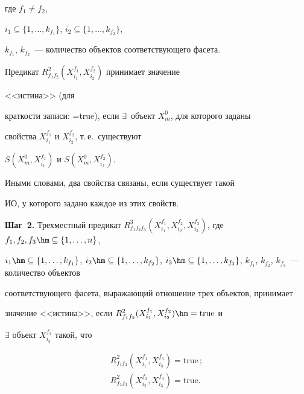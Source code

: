 где $f_1 \not=f_2$,


$i_1\subseteq \{1, \ldots , k_{f_1}\}$, $i_2\subseteq \{1, \ldots , k_{f_2}\}$,


$k_{f_1}$, $k_{f_2}$~--- количество объектов соответствующего фасета.





  Предикат $R^2_{f_1 f_2}(X_{i_1}^{f_1},X_{i_2}^{f_2})$ принимает значение


  <<истина>> (для


краткости записи: =\;true), если $\exists$\ объект $X_m^0$, для которого заданы


свойства $X_{i_1}^{f_1}$ и $X_{i_2}^{f_2}$, т.\,е.\ существуют


${S}(X_m^0,X_{i_1}^{f_1})$ и ${S}(X_m^0, X_{i_2}^{f_2})$.





  Иными словами, два свойства связаны, если существует такой


ИО, у которого задано каждое из этих свойств.





  \textbf{Шаг~2.} Трехместный предикат $R^3_{f_1 f_2 f_3}


  (X_{i_1}^{f_1},X_{i_2}^{f_2},X_{i_3}^{f_3})$, где $f_1, f_2, f_3


  \hm\subseteq\{1, \ldots , n\}$,


$i_1 \hm\subseteq\{1, \ldots , k_{f_1}\}$, $i_2 \hm\subseteq \{1, \ldots  , k_{f_2}\}$, $i_3\hm\subseteq\{1,


\ldots  , k_{f_3}\}$, $k_{f_1}$, $k_{f_2}$, $k_{f_3}$~--- количество объектов


соответствующего фасета, выражающий отношение трех объектов, принимает


значение <<истина>>, если $R^2_{f_1 f_2} (X_{i_1}^{f_1},X_{i_2}^{f_2})\hm


= \mathrm{true}$ и


$\exists$ объект $X_{i_3}^{f_3}$ такой, что


  \begin{gather*}


  {R}^2_{f_1 f_3}(X_{i_1}^{f_1}, X_{i_3}^{f_3}) = \mathrm{true}\,;\\


  {R}^2_{f_2 f_3}(X_{i_2}^{f_2},X_{i_3}^{f_3}) = \mathrm{true}.


  \end{gather*}





